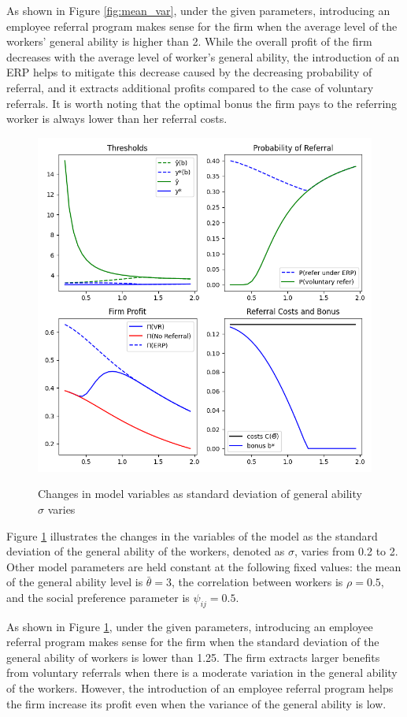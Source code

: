 \documentclass[12pt]{article}
\begin{document}
As shown in Figure \ref{fig:mean_var}, under the given parameters, introducing an employee referral program makes sense for the firm when the average level of the workers' general ability is higher than 2. While the overall profit of the firm decreases with the average level of worker's general ability, the introduction of an ERP helps to mitigate this decrease caused by the decreasing probability of referral, and it extracts additional profits compared to the case of voluntary referrals. It is worth noting that the optimal bonus the firm pays to the referring worker is always lower than her referral costs.

\begin{figure}[ht]
    \caption{Changes in model variables as standard deviation of general ability $\sigma$ varies}
    \includegraphics[width=12cm]{images/imperf_st_dev_var.png}
    \centering
    \label{fig:st_dev_var}
\end{figure}

Figure \ref{fig:st_dev_var} illustrates the changes in the  variables of the model as the standard deviation of the general ability of the workers, denoted as $\sigma$, varies from 0.2 to 2. Other model parameters are held constant at the following fixed values: the mean of the general ability level is $\bar{\theta} = 3$, the correlation between workers is $\rho = 0.5$, and the social preference parameter is $\psi_{ij} = 0.5$.

As shown in Figure \ref{fig:st_dev_var}, under the given parameters, introducing an employee referral program makes sense for the firm when the standard deviation of the general  ability of workers is lower than 1.25. The firm extracts larger benefits from voluntary referrals when there is a moderate variation in the general ability of the workers. However, the introduction of an employee referral program helps the firm increase its profit even when the variance of the general ability is low.
\end{document}
